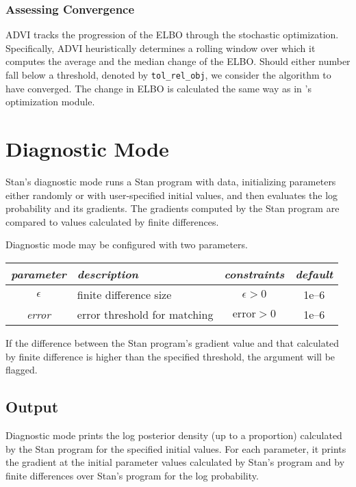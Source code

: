 \subsection{Assessing Convergence}

ADVI tracks the progression of the ELBO through the stochastic
optimization.  Specifically, ADVI heuristically determines a rolling
window over which it computes the average and the median change of the
ELBO. Should either number fall below a threshold, denoted by
\texttt{tol\_rel\_obj}, we consider the algorithm to have
converged. The change in ELBO is calculated the same way as in \Stan's
optimization module.


\chapter{Diagnostic Mode}\label{diagnostic-algorithms.chapter}

\noindent
Stan's diagnostic mode runs a Stan program with data, initializing
parameters either randomly or with user-specified initial values, and
then evaluates the log probability and its gradients. The gradients
computed by the Stan program are compared to values calculated by
finite differences.

Diagnostic mode may be configured with two parameters.
%
\begin{center}
\begin{tabular}{c|lcc}
{\it parameter} & {\it description} & {\it constraints} & {\it
  default}
\\ \hline
{\it $\epsilon$} & finite difference size & $\epsilon > 0$ & 1e--6
\\
{\it error} & error threshold for matching & $\mbox{error} > 0$ & 1e--6
\end{tabular}
\end{center}
%
If the difference between the Stan program's gradient value and that
calculated by finite difference is higher than the specified
threshold, the argument will be flagged.

\section{Output}

Diagnostic mode prints the log posterior density (up to a proportion)
calculated by the Stan program for the specified initial values. For
each parameter, it prints the gradient at the initial parameter values
calculated by Stan's program and by finite differences over Stan's
program for the log probability.

